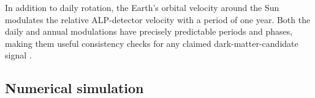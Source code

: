 In addition to daily rotation, the Earth's orbital velocity around the Sun modulates the relative ALP-detector velocity with a period of one year. Both the daily and annual modulations have precisely predictable periods and phases, making them useful consistency checks for any claimed dark-matter-candidate signal \cite{Gramolin2022Feb_SpectralSignatures}.




\subsection{Numerical simulation}\label{sec:theory:MW:simulation}

